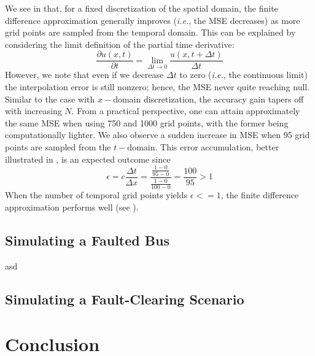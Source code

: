 \documentclass{article}
\begin{document}
We see in  that,
for a fixed discretization of the spatial domain,
the finite difference approximation generally improves
(\textit{i.e.}, the MSE decreases)
as more grid points are sampled from the temporal domain.
This can be explained by considering the limit definition of the partial time derivative:
\begin{equation}
	\label{eqn: Limit definition of the partial derivative wrt to t}
	\frac{\partial u \left(x,t\right)}{\partial t}
	=
	\lim_{\Delta t \longrightarrow 0}
	\frac{u \left(x, t + \Delta t\right)}{\Delta t}
\end{equation}
However, we note that even if we decrease $\Delta t$ to zero
(\textit{i.e.}, the continuous limit)
the interpolation error is still nonzero;
hence, the MSE never quite reaching null.
Similar to the case with $x-$domain discretization,
the accuracy gain tapers off with increasing $N$.
From a practical perspective, one can attain approximately the same MSE when using 750 and 1000 grid points,
with the former being computationally lighter.
We also observe a sudden increase in MSE when 95 grid points are sampled from the $t-$domain.
This error accumulation,
better illustrated in ,
is an expected outcome since
\begin{equation*}
	\epsilon = c \frac{\Delta t}{\Delta x}
	= \frac{\frac{1 - 0}{95 - 0}}{\frac{1 - 0}{100-0}}
	= \frac{100}{95}
	> 1
\end{equation*}
When the number of temporal grid points yields $\epsilon <= 1$,
the finite difference approximation performs well (see ).

\subsection{Simulating a Faulted Bus}
\label{subsec: Simulating a Faulted Bus}

asd 

\lipsum[84]

\subsection{Simulating a Fault-Clearing Scenario}
\label{subsec: Simulating a Fault-Clearing Scenario}

\lipsum[85]

\section{Conclusion}
\label{sec: Conclusion}
\end{document}
